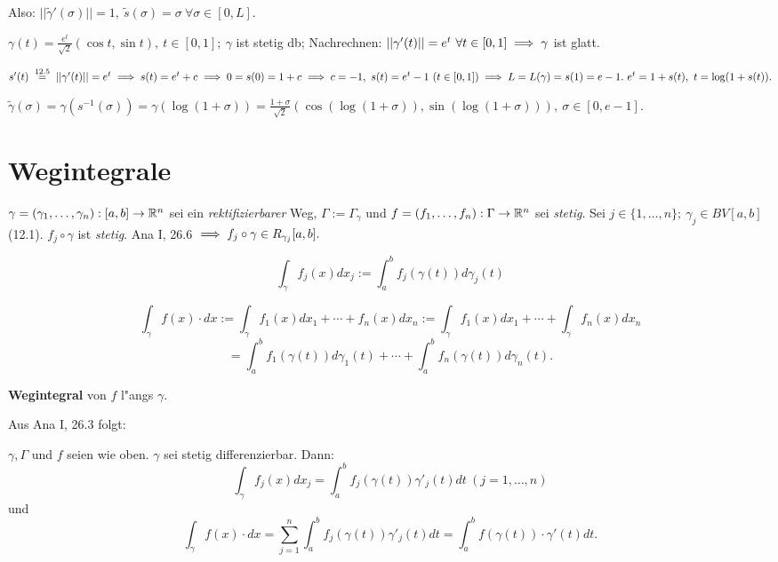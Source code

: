 \documentclass[a4paper,twoside,DIV15,BCOR12mm]{scrbook}
\begin{document}
Also: $||\tilde{\gamma}'(\sigma)|| = 1,\ \tilde{s}(\sigma)=\sigma\ \forall \sigma\in[0,L].$

\begin{beispiel}
$\gamma(t) = \frac{e^t}{\sqrt{2}}(\cos t,\sin t),\ t \in [0,1];\ \gamma$ ist stetig db; Nachrechnen: $||\gamma'(t)||=e^t\ \forall t \in [0,1] \implies \gamma$ ist glatt.

$s'(t) \gleichnach{12.5} ||\gamma'(t)|| = e^t \folgt s(t) = e^t+c \folgt 0=s(0) = 1+c \folgt c=-1,\ s(t) = e^t-1\ (t\in[0,1]) \folgt L=L(\gamma)=s(1)=e-1.\ e^t=1+s(t),\ t=\log (1+s(t)).$

$\tilde{\gamma}(\sigma) = \gamma(s^{-1}(\sigma)) = \gamma(\log (1+\sigma)) = \frac{1+\sigma}{\sqrt{2}}(\cos (\log(1+\sigma)),\sin (\log(1+\sigma))),\ \sigma\in[0,e-1].$
\end{beispiel}

\chapter{Wegintegrale}
 
\begin{definition}

$\gamma=(\gamma_1,\ldots,\gamma_n):[a,b] \to \mathbb{R}^n$ sei ein \emph{rektifizierbarer} Weg, $\Gamma:=\Gamma_\gamma$ und $f=(f_1,\ldots,f_n):\Gamma \to \mathbb{R}^n$ sei \emph{stetig}. Sei $j\in\{1,\ldots,n\};\ \gamma_j\in BV[a,b]$ (12.1). $f_j\circ \gamma$ ist \emph{stetig}. Ana I, 26.6 $\implies f_j\circ\gamma \in R_{\gamma_j}[a,b].$

$$\int_\gamma f_j(x)dx_j := \int_a^b f_j(\gamma(t))d\gamma_j(t)$$

$$\int_\gamma f(x)\cdot dx := \int_\gamma f_1(x)dx_1+\cdots+f_n(x)dx_n := \int_\gamma f_1(x)dx_1+\cdots+\int_\gamma f_n(x)dx_n$$
$$= \int_a^b f_1(\gamma(t)) d\gamma_1(t)+\cdots +\int_a^b f_n(\gamma(t)) d\gamma_n(t).$$

\textbf{Wegintegral} von $f$ l"angs $\gamma$.
\end{definition}

Aus Ana I, 26.3 folgt:

\begin{satz}
$\gamma,\Gamma$ und $f$ seien wie oben. $\gamma$ sei stetig differenzierbar. Dann:
$$\int_\gamma f_j(x)dx_j = \int_a^b f_j(\gamma(t))\gamma'_j(t)dt\ (j=1,\ldots,n)$$ und $$\int_\gamma f(x)\cdot dx = \sum_{j=1}^{n} \int_a^b f_j(\gamma(t))\gamma'_j(t) dt = \int_a^b f(\gamma(t))\cdot\gamma'(t) dt.$$
\end{satz}
\end{document}
